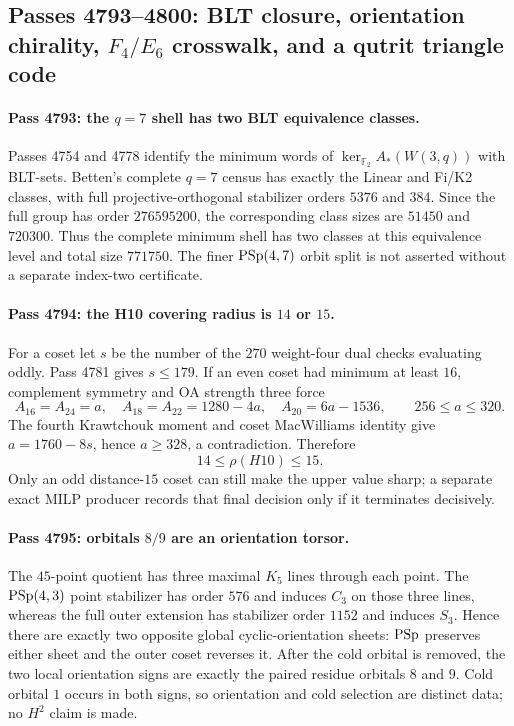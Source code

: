 \subsection*{Passes 4793--4800: BLT closure, orientation chirality, $F_4/E_6$ crosswalk, and a qutrit triangle code}

\paragraph{Pass 4793: the $q=7$ shell has two BLT equivalence classes.}
Passes 4754 and 4778 identify the minimum words of $\ker_{\mathbb F_2}A_*(W(3,q))$ with BLT-sets.  Betten's complete $q=7$ census has exactly the Linear and Fi/K2 classes, with full projective-orthogonal stabilizer orders $5376$ and $384$.  Since the full group has order $276595200$, the corresponding class sizes are $51450$ and $720300$.  Thus the complete minimum shell has two classes at this equivalence level and total size $771750$.  The finer $\mathrm{PSp}(4,7)$ orbit split is not asserted without a separate index-two certificate.

\paragraph{Pass 4794: the H10 covering radius is $14$ or $15$.}
For a coset let $s$ be the number of the $270$ weight-four dual checks evaluating oddly.  Pass 4781 gives $s\le179$.  If an even coset had minimum at least $16$, complement symmetry and OA strength three force
\[
 A_{16}=A_{24}=a,\quad A_{18}=A_{22}=1280-4a,\quad A_{20}=6a-1536,
 \qquad 256\le a\le320.
\]
The fourth Krawtchouk moment and coset MacWilliams identity give $a=1760-8s$, hence $a\ge328$, a contradiction.  Therefore
\[
 \boxed{14\le\rho(H10)\le15}.
\]
Only an odd distance-$15$ coset can still make the upper value sharp; a separate exact MILP producer records that final decision only if it terminates decisively.

\paragraph{Pass 4795: orbitals $8/9$ are an orientation torsor.}
The $45$-point quotient has three maximal $K_5$ lines through each point.  The $\mathrm{PSp}(4,3)$ point stabilizer has order $576$ and induces $C_3$ on those three lines, whereas the full outer extension has stabilizer order $1152$ and induces $S_3$.  Hence there are exactly two opposite global cyclic-orientation sheets: $\mathrm{PSp}$ preserves either sheet and the outer coset reverses it.  After the cold orbital is removed, the two local orientation signs are exactly the paired residue orbitals $8$ and $9$.  Cold orbital $1$ occurs in both signs, so orientation and cold selection are distinct data; no $H^2$ claim is made.

